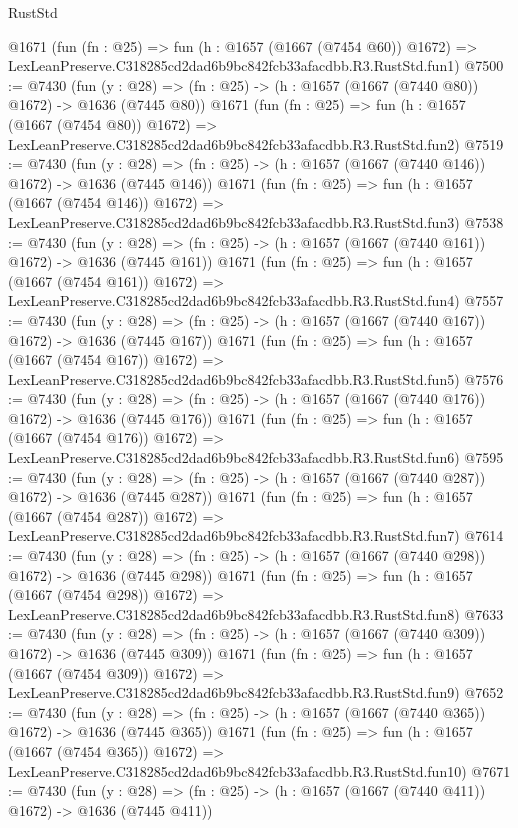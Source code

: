\begin{lexlean}{RustStd}
\begin{coremodule}
    @1671
    (fun (fn : @25) =>
    fun (h : @1657 (@1667 (@7454 @60)) @1672) =>
    LexLeanPreserve.C318285cd2dad6b9bc842fcb33afacdbb.R3.RustStd.fun1)
@7500 := @7430
    (fun (y : @28) => (fn : @25) -> (h : @1657 (@1667 (@7440 @80)) @1672) -> @1636 (@7445 @80))
    @1671
    (fun (fn : @25) =>
    fun (h : @1657 (@1667 (@7454 @80)) @1672) =>
    LexLeanPreserve.C318285cd2dad6b9bc842fcb33afacdbb.R3.RustStd.fun2)
@7519 := @7430
    (fun (y : @28) => (fn : @25) -> (h : @1657 (@1667 (@7440 @146)) @1672) -> @1636 (@7445 @146))
    @1671
    (fun (fn : @25) =>
    fun (h : @1657 (@1667 (@7454 @146)) @1672) =>
    LexLeanPreserve.C318285cd2dad6b9bc842fcb33afacdbb.R3.RustStd.fun3)
@7538 := @7430
    (fun (y : @28) => (fn : @25) -> (h : @1657 (@1667 (@7440 @161)) @1672) -> @1636 (@7445 @161))
    @1671
    (fun (fn : @25) =>
    fun (h : @1657 (@1667 (@7454 @161)) @1672) =>
    LexLeanPreserve.C318285cd2dad6b9bc842fcb33afacdbb.R3.RustStd.fun4)
@7557 := @7430
    (fun (y : @28) => (fn : @25) -> (h : @1657 (@1667 (@7440 @167)) @1672) -> @1636 (@7445 @167))
    @1671
    (fun (fn : @25) =>
    fun (h : @1657 (@1667 (@7454 @167)) @1672) =>
    LexLeanPreserve.C318285cd2dad6b9bc842fcb33afacdbb.R3.RustStd.fun5)
@7576 := @7430
    (fun (y : @28) => (fn : @25) -> (h : @1657 (@1667 (@7440 @176)) @1672) -> @1636 (@7445 @176))
    @1671
    (fun (fn : @25) =>
    fun (h : @1657 (@1667 (@7454 @176)) @1672) =>
    LexLeanPreserve.C318285cd2dad6b9bc842fcb33afacdbb.R3.RustStd.fun6)
@7595 := @7430
    (fun (y : @28) => (fn : @25) -> (h : @1657 (@1667 (@7440 @287)) @1672) -> @1636 (@7445 @287))
    @1671
    (fun (fn : @25) =>
    fun (h : @1657 (@1667 (@7454 @287)) @1672) =>
    LexLeanPreserve.C318285cd2dad6b9bc842fcb33afacdbb.R3.RustStd.fun7)
@7614 := @7430
    (fun (y : @28) => (fn : @25) -> (h : @1657 (@1667 (@7440 @298)) @1672) -> @1636 (@7445 @298))
    @1671
    (fun (fn : @25) =>
    fun (h : @1657 (@1667 (@7454 @298)) @1672) =>
    LexLeanPreserve.C318285cd2dad6b9bc842fcb33afacdbb.R3.RustStd.fun8)
@7633 := @7430
    (fun (y : @28) => (fn : @25) -> (h : @1657 (@1667 (@7440 @309)) @1672) -> @1636 (@7445 @309))
    @1671
    (fun (fn : @25) =>
    fun (h : @1657 (@1667 (@7454 @309)) @1672) =>
    LexLeanPreserve.C318285cd2dad6b9bc842fcb33afacdbb.R3.RustStd.fun9)
@7652 := @7430
    (fun (y : @28) => (fn : @25) -> (h : @1657 (@1667 (@7440 @365)) @1672) -> @1636 (@7445 @365))
    @1671
    (fun (fn : @25) =>
    fun (h : @1657 (@1667 (@7454 @365)) @1672) =>
    LexLeanPreserve.C318285cd2dad6b9bc842fcb33afacdbb.R3.RustStd.fun10)
@7671 := @7430
    (fun (y : @28) => (fn : @25) -> (h : @1657 (@1667 (@7440 @411)) @1672) -> @1636 (@7445 @411))

\end{coremodule}
\end{lexlean}
